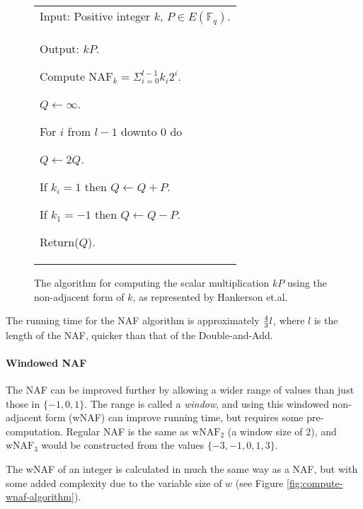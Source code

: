 \begin{figure}[htb!]
	\centering
	\begin{tabular}{|p{\textwidth}|}
		\hline
		Input: Positive integer \(k\), \(P \in E(\mathbb{F}_q)\). \\
		Output: \(kP\).

		\begin{enumerate*}
			\item Compute \(\text{NAF}_k = \Sigma^{l-1}_{i=0} k_i2^i\).
			\item \(Q \gets \infty\).
			\item For \(i\) from \(l-1\) downto \(0\) do
			\begin{enumerate*}
				\item \(Q \gets 2Q\).
				\item If \(k_i = 1\) then \(Q \gets Q + P\).
				\item If \(k_1 = -1\) then \(Q \gets Q - P\).
			\end{enumerate*}
			\item Return(\(Q\)).
		\end{enumerate*}
		\\
		\hline
	\end{tabular}
	\caption{The algorithm for computing the scalar multiplication \(kP\) using the non-adjacent form of \(k\), as represented by
		Hankerson et.al.\cite{hankerson2010}}
	\label{fig:naf-algorithm}
\end{figure}

The running time for the NAF algorithm is approximately \({4 \over 3} l\), where \(l\) is the length of the NAF, quicker than that
of the Double-and-Add.\cite{hankerson2010}

\paragraph{Windowed NAF}

The NAF can be improved further by allowing a wider range of values than just those in \(\{-1,0,1\}\). The range is called a \emph{window}, and
using this windowed non-adjacent form (wNAF) can improve running time, but requires some pre-computation. Regular NAF is the same
as \(\text{wNAF}_2\) (a window size of 2), and \(\text{wNAF}_3\) would be constructed from the values \(\{-3,-1,0,1,3\}\).

The wNAF of an integer is calculated in much the same way as a NAF, but with some added complexity due to the variable size of \(w\)
(see Figure \ref{fig:compute-wnaf-algorithm}).

